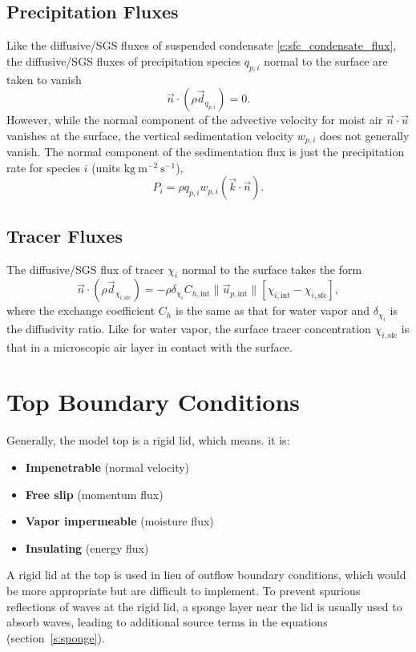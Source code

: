\documentclass{report}
\begin{document}
\subsection{Precipitation Fluxes}

Like the diffusive/SGS fluxes of suspended condensate \eqref{e:sfc_condensate_flux}, the diffusive/SGS fluxes of precipitation species $q_{p, i}$ normal to the surface are taken to vanish
\begin{equation}\label{e:sfc_precip}
 \vec{n} \cdot (\rho \vec{d}_{q_{p, i}}) = 0.
\end{equation} 
However, while the normal component of the advective velocity for moist air $\vec{n} \cdot \vec{u}$ vanishes at the surface, the vertical sedimentation velocity $w_{p,i}$ does not generally vanish. The normal component of the sedimentation flux is just the precipitation rate for species $i$ (units $\mathrm{kg~m^{-2}~s^{-1}}$),
\begin{equation}
    P_i = \rho q_{p, i} w_{p, i} (\vec{k} \cdot \vec{n}).
\end{equation}


\subsection{Tracer Fluxes}

The diffusive/SGS flux of tracer $\chi_i$ normal to the surface takes the form 
\begin{equation}\label{e:sfc_tracer}
 \vec{n} \cdot (\rho \vec{d}_{\chi_{i, \mathrm{sfc}}}) = - \rho \delta_{\chi_i} C_{h, \mathrm{int}} \| \vec{u}_{p, \mathrm{int}} \| \left[\chi_{i, \mathrm{int}} - \chi_{i, \mathrm{sfc}} \right],
\end{equation} 
where the exchange coefficient $C_h$ is the same as that for water vapor and $\delta_{\chi_i}$ is the diffusivity ratio. Like for water vapor, the surface tracer concentration $\chi_{i, \mathrm{sfc}}$ is that in a microscopic air layer in contact with the surface.

\section{Top Boundary Conditions} 

Generally, the model top is a rigid lid, which means. it is:
\begin{itemize}
    \item \textbf{Impenetrable} (normal velocity)
    \item \textbf{Free slip} (momentum flux)
    \item \textbf{Vapor impermeable} (moisture flux)
    \item \textbf{Insulating} (energy flux)
\end{itemize}
A rigid lid at the top is used in lieu of outflow boundary conditions, which would be more appropriate but are difficult to implement. To prevent spurious reflections of waves at the rigid lid, a sponge layer near the lid is usually used to absorb waves, leading to additional source terms in the equations (section~\ref{s:sponge}).
\end{document}
